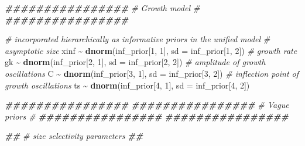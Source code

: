 \documentclass[
]{article}
\newenvironment{Shaded}{\begin{snugshade}}{\end{snugshade}}
\newcommand{\AttributeTok}[1]{\textcolor[rgb]{0.13,0.29,0.53}{#1}}
\newcommand{\CommentTok}[1]{\textcolor[rgb]{0.56,0.35,0.01}{\textit{#1}}}
\newcommand{\DecValTok}[1]{\textcolor[rgb]{0.00,0.00,0.81}{#1}}
\newcommand{\DocumentationTok}[1]{\textcolor[rgb]{0.56,0.35,0.01}{\textbf{\textit{#1}}}}
\newcommand{\FunctionTok}[1]{\textcolor[rgb]{0.13,0.29,0.53}{\textbf{#1}}}
\newcommand{\NormalTok}[1]{#1}
\newcommand{\SpecialCharTok}[1]{\textcolor[rgb]{0.81,0.36,0.00}{\textbf{#1}}}
\begin{document}
\begin{Shaded}
\begin{Highlighting}[]
  \DocumentationTok{\#\#\#\#\#\#\#\#\#\#\#\#\#\#\#\#}
  \CommentTok{\# Growth model \#}
  \DocumentationTok{\#\#\#\#\#\#\#\#\#\#\#\#\#\#\#\#}
  
  \CommentTok{\# incorporated hierarchically as informative priors in the unified model}
  \CommentTok{\# asymptotic size}
\NormalTok{  xinf }\SpecialCharTok{\textasciitilde{}} \FunctionTok{dnorm}\NormalTok{(inf\_prior[}\DecValTok{1}\NormalTok{, }\DecValTok{1}\NormalTok{], }\AttributeTok{sd =}\NormalTok{ inf\_prior[}\DecValTok{1}\NormalTok{, }\DecValTok{2}\NormalTok{])}
  \CommentTok{\# growth rate}
\NormalTok{  gk }\SpecialCharTok{\textasciitilde{}} \FunctionTok{dnorm}\NormalTok{(inf\_prior[}\DecValTok{2}\NormalTok{, }\DecValTok{1}\NormalTok{], }\AttributeTok{sd =}\NormalTok{ inf\_prior[}\DecValTok{2}\NormalTok{, }\DecValTok{2}\NormalTok{])}
  \CommentTok{\# amplitude of growth oscillations}
\NormalTok{  C }\SpecialCharTok{\textasciitilde{}} \FunctionTok{dnorm}\NormalTok{(inf\_prior[}\DecValTok{3}\NormalTok{, }\DecValTok{1}\NormalTok{], }\AttributeTok{sd =}\NormalTok{ inf\_prior[}\DecValTok{3}\NormalTok{, }\DecValTok{2}\NormalTok{])}
  \CommentTok{\# inflection point of growth oscillations}
\NormalTok{  ts }\SpecialCharTok{\textasciitilde{}} \FunctionTok{dnorm}\NormalTok{(inf\_prior[}\DecValTok{4}\NormalTok{, }\DecValTok{1}\NormalTok{], }\AttributeTok{sd =}\NormalTok{ inf\_prior[}\DecValTok{4}\NormalTok{, }\DecValTok{2}\NormalTok{])}
  
  
  
  
  \DocumentationTok{\#\#\#\#\#\#\#\#\#\#\#\#\#\#\#\#}
  \DocumentationTok{\#\#\#\#\#\#\#\#\#\#\#\#\#\#\#\#}
  \CommentTok{\# Vague priors \#}
  \DocumentationTok{\#\#\#\#\#\#\#\#\#\#\#\#\#\#\#\#}
  \DocumentationTok{\#\#\#\#\#\#\#\#\#\#\#\#\#\#\#\#}
  
  \DocumentationTok{\#\#}
  \CommentTok{\# size selectivity parameters}
  \DocumentationTok{\#\#}


\end{Highlighting}
\end{Shaded}
\end{document}
